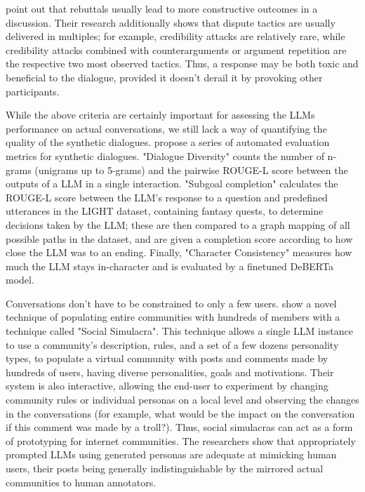 \cite{dekock2022disagree} point out that rebuttals usually lead to more constructive outcomes in a discussion. Their research additionally shows that dispute tactics are usually delivered in multiples; for example, credibility attacks are relatively rare, while credibility attacks combined with counterarguments or argument repetition are the respective two most observed tactics. Thus, a response may be both toxic and beneficial to the dialogue, provided it doesn't derail it by provoking other participants.

While the above criteria are certainly important for assessing the LLMs performance on actual conversations, we still lack a way of quantifying the quality of the synthetic dialogues. \cite{ulmer2024bootstrappingllmbasedtaskorienteddialogue} propose a series of automated evaluation metrics for synthetic dialogues. "Dialogue Diversity" counts the number of n-grams (unigrams up to 5-grams) and the pairwise ROUGE-L \cite{lin-2004-rouge} score between the outputs of a LLM in a single interaction. "Subgoal completion" calculates the ROUGE-L score between the LLM's response to a question and predefined utterances in the LIGHT \cite{urbanek-etal-2019-learning} dataset, containing fantasy quests, to determine decisions taken by the LLM; these are then compared to a graph mapping of all possible paths in the dataset, and are given a completion score according to how close the LLM was to an ending. Finally, "Character Consistency" measures how much the LLM stays in-character and is evaluated by a finetuned DeBERTa \cite{he2023debertav3improvingdebertausing} model.

Conversations don't have to be constrained to only a few users. \cite{park2022socialsimulacracreatingpopulated} show a novel technique of populating entire communities with hundreds of members with a technique called "Social Simulacra". This technique allows a single LLM instance to use a community's description, rules, and a set of a few dozens personality types, to populate a virtual community with posts and comments made by hundreds of users, having diverse personalities, goals and motivations. Their system is also interactive, allowing the end-user to experiment by changing community rules or individual personas on a local level and observing the changes in the conversations (for example, what would be the impact on the conversation if this comment was made by a troll?). Thus, social simulacras can act as a form of prototyping for internet communities. The researchers show that appropriately prompted LLMs using generated personas are adequate at mimicking human users, their posts being generally indistinguishable by the mirrored actual communities to human annotators.  

